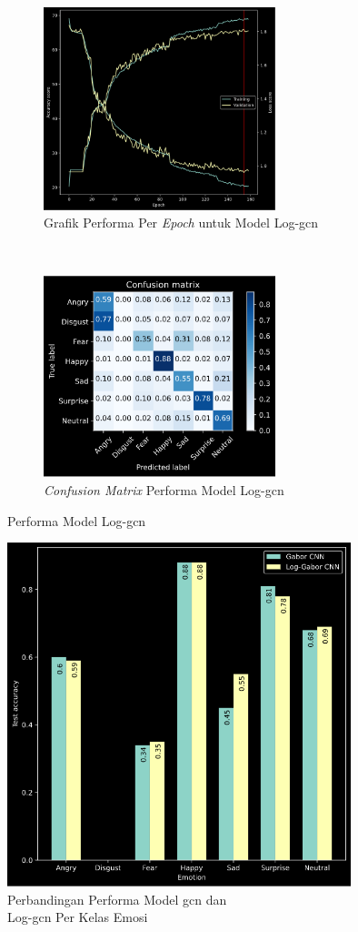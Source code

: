 \begin{figure}[t]
    \centering
    \begin{subfigure}[t]{6.75cm}
        \includegraphics[width=6.75cm]{gambar/eksperimen5a_grafik1.png}
        \caption{Grafik Performa Per \textit{Epoch} untuk Model Log-\acrshort{gcn}}
        \label{fig:confusionmatrixeksperimen5a}
    \end{subfigure}
    ~~~
    \begin{subfigure}[t]{6.75cm}
        \includegraphics[width=6.75cm]{gambar/eksperimen5a_matriks1.png}
        \caption{\textit{Confusion Matrix} Performa Model Log-\acrshort{gcn}}
        \label{fig:confusionmatrixeksperimen5a}
    \end{subfigure}
    \caption{Performa Model Log-\acrshort{gcn}}
    \label{fig:hasileksperimen5a}
\end{figure}
\begin{figure}[t]
    \centering
    \includegraphics[width=10cm]{gambar/eksperimen3vs5_grafik1.png}
    \caption{Perbandingan Performa Model \acrshort{gcn} dan\\Log-\acrshort{gcn} Per Kelas Emosi}
    \label{fig:perbandinganeksperimen3dan5a}
\end{figure}

